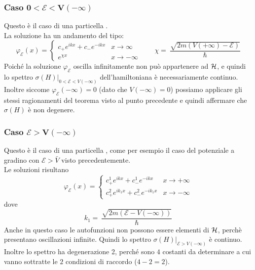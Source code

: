 \documentclass[../../FisicaTeorica.tex]{subfiles}
\begin{document}
\subsubsection{Caso $\bm{0 < \mathcal{E} < V(-\infty)}$}
Questo è il caso di una particella .\\
La soluzione ha un andamento del tipo:
\[
\varphi_\mathcal{E}(x) = \begin{cases}
c_+ e^{ikx} + c_-e^{-ikx} & x\to\infty\\
e^{\chi x} & x\to-\infty
\end{cases} \qquad \chi =\ \frac{\sqrt{2m(V(+\infty)-\mathcal{E})}}{\hbar}
\]
Poiché la soluzione $\varphi_{\mathcal E}$ oscilla infinitamente non può appartenere ad $\mathcal{H}$, e quindi lo spettro $\sigma(H)|_{0<\mathcal{E}<V(-\infty)}$ dell'hamiltoniana è necessariamente continuo.
Inoltre siccome $\varphi_\mathcal{E}(-\infty) = 0$ (dato che $V(-\infty) = 0$) possiamo applicare gli stessi ragionamenti del teorema visto al punto precedente e quindi affermare che $\sigma(H)$ è non degenere.

\subsubsection{Caso $\bm{\mathcal{E} > V(-\infty)}$}
Questo è il caso di una particella , come per esempio il caso del potenziale a gradino con $\mathcal{E}>\bar{V}$ visto precedentemente.\\
Le soluzioni risultano
\[
\varphi_\mathcal{E}(x) = \begin{cases}
c^1_+ e^{ikx} + c^1_- e^{-ikx} & x\to +\infty\\
c^2_+ e^{ik_1 x} + c^2_- e^{-ik_1 x} & x\to -\infty
\end{cases}
\]
dove
\[
k_1 =\ \frac{\sqrt{2m(\mathcal{E}-V(-\infty))}}{\hbar}
\]
Anche in questo caso le autofunzioni non possono essere elementi di $\mathcal{H}$, perchè presentano oscillazioni infinite. Quindi lo spettro $\sigma(H)|_{\mathcal{E}>V(-\infty)}$ è continuo. Inoltre lo spettro ha degenerazione 2, perché sono $4$ costanti da determinare a cui vanno sottratte le $2$ condizioni di raccordo ($4 - 2 = 2$).
\end{document}

